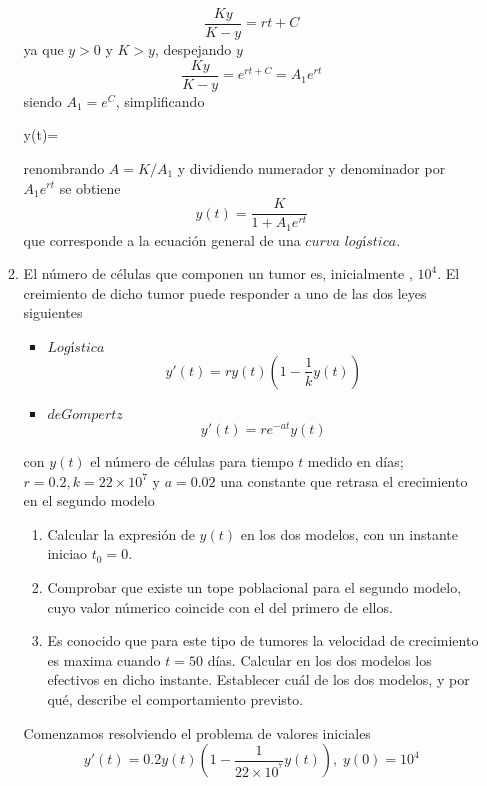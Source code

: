 \documentclass[10pt,a4paper,notitlepage]{report}
\begin{document}
\begin{itemize}
\begin{enumerate}
\begin{equation}
\frac{Ky}{K - y} = rt + C
\end{equation}
 ya que $y > 0$ y $K > y$,  despejando $y$
 \begin{equation}
\frac{Ky}{K - y} = e^{rt + C} =  A_{1} e^{rt}
 \end{equation}
 siendo $A_{1} = e^{C}$, simplificando
 \begin{enumerate}
y(t)= 
 \end{enumerate} 
 renombrando $A  = K/ A_{1}$ y dividiendo numerador y denominador por $ A_{1} e^{rt}$ se obtiene
 \begin{equation}
y(t)= \frac{K}{1 + A_{1} e^{rt} }
 \end{equation}
 que corresponde a la ecuación general de una $curva$ $logística$.
 \Large
 \item El número de células que componen un tumor es, inicialmente , $10^{4}$. El creimiento de dicho tumor puede responder a uno de las dos leyes siguientes
 \begin{itemize}
 \item $Logística$
 \begin{equation}
y'(t) = ry (t) (1 - \frac{1}{k} y(t))
 \end{equation}
 \item $de Gompertz$
 \begin{equation}
y'(t) =re^{-at} y(t)
 \end{equation}
 \end{itemize}
 con $y(t)$ el número de células para tiempo $t$ medido en días; $r=0.2, k= 22 \times 10^{7}$ y $a = 0.02$ una constante que retrasa el crecimiento en el segundo modelo
 \begin{enumerate}
\item Calcular la expresión de $y(t)$ en los dos modelos, con un instante iniciao $t_{0} = 0$. 
\item Comprobar que existe un tope poblacional para el segundo modelo, cuyo valor númerico coincide con el del primero de ellos.
\item Es conocido que para este tipo de tumores la velocidad de crecimiento es maxima cuando $t = 50$ días. Calcular en los dos modelos los efectivos en dicho instante. Establecer cuál de los dos modelos, y por qué, describe el comportamiento previsto.
 \end{enumerate}
 \large
 Comenzamos resolviendo el problema de valores iniciales 
 \begin{equation}
y'(t) = 0.2 y(t) (1 - \frac{1}{22 \times 10^^{7}} y (t)), \; y(0) = 10^{4}

\end{equation}
\end{enumerate}
\end{itemize}
\end{document}
